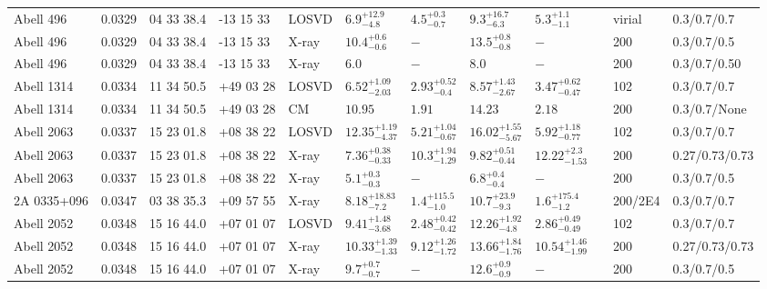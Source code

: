 \begin{landscape}
\begin{center}
{\begin{longtable}{llllllllllll}
Abell 496 & 0.0329 & 04 33 38.4 & -13 15 33 & LOSVD & ${6.9}^{+12.9}_{-4.8}$ & ${4.5}^{+0.3}_{-0.7}$ & ${9.3}^{+16.7}_{-6.3}$ & ${5.3}^{+1.1}_{-1.1}$ & \citet{LO06.1} & virial & 0.3/0.7/0.7 \\
Abell 496 & 0.0329 & 04 33 38.4 & -13 15 33 & X-ray & ${10.4}^{+0.6}_{-0.6}$ & ${-}^{}_{}$ & ${13.5}^{+0.8}_{-0.8}$ & ${-}^{}_{}$ & \citet{XU01.1} & 200 & 0.3/0.7/0.5 \\
Abell 496 & 0.0329 & 04 33 38.4 & -13 15 33 & X-ray & ${6.0}^{}_{}$ & ${-}^{}_{}$ & ${8.0}^{}_{}$ & ${-}^{}_{}$ & \citet{MA99.1} & 200 & 0.3/0.7/0.50 \\
Abell 1314 & 0.0334 & 11 34 50.5 & +49 03 28 & LOSVD & ${6.52}^{+1.09}_{-2.03}$ & ${2.93}^{+0.52}_{-0.4}$ & ${8.57}^{+1.43}_{-2.67}$ & ${3.47}^{+0.62}_{-0.47}$ & \citet{WO10.1} & 102 & 0.3/0.7/0.7 \\
Abell 1314 & 0.0334 & 11 34 50.5 & +49 03 28 & CM & ${10.95}^{}_{}$ & ${1.91}^{}_{}$ & ${14.23}^{}_{}$ & ${2.18}^{}_{}$ & \citet{RI06.1} & 200 & 0.3/0.7/None \\
Abell 2063 & 0.0337 & 15 23 01.8 & +08 38 22 & LOSVD & ${12.35}^{+1.19}_{-4.37}$ & ${5.21}^{+1.04}_{-0.67}$ & ${16.02}^{+1.55}_{-5.67}$ & ${5.92}^{+1.18}_{-0.77}$ & \citet{WO10.1} & 102 & 0.3/0.7/0.7 \\
Abell 2063 & 0.0337 & 15 23 01.8 & +08 38 22 & X-ray & ${7.36}^{+0.38}_{-0.33}$ & ${10.3}^{+1.94}_{-1.29}$ & ${9.82}^{+0.51}_{-0.44}$ & ${12.22}^{+2.3}_{-1.53}$ & \citet{BA14.1} & 200 & 0.27/0.73/0.73 \\
Abell 2063 & 0.0337 & 15 23 01.8 & +08 38 22 & X-ray & ${5.1}^{+0.3}_{-0.3}$ & ${-}^{}_{}$ & ${6.8}^{+0.4}_{-0.4}$ & ${-}^{}_{}$ & \citet{XU01.1} & 200 & 0.3/0.7/0.5 \\
2A 0335+096 & 0.0347 & 03 38 35.3 & +09 57 55 & X-ray & ${8.18}^{+18.83}_{-7.2}$ & ${1.4}^{+115.5}_{-1.0}$ & ${10.7}^{+23.9}_{-9.3}$ & ${1.6}^{+175.4}_{-1.2}$ & \citet{VO06.1} & 200/2E4 & 0.3/0.7/0.7 \\
Abell 2052 & 0.0348 & 15 16 44.0 & +07 01 07 & LOSVD & ${9.41}^{+1.48}_{-3.68}$ & ${2.48}^{+0.42}_{-0.42}$ & ${12.26}^{+1.92}_{-4.8}$ & ${2.86}^{+0.49}_{-0.49}$ & \citet{WO10.1} & 102 & 0.3/0.7/0.7 \\
Abell 2052 & 0.0348 & 15 16 44.0 & +07 01 07 & X-ray & ${10.33}^{+1.39}_{-1.33}$ & ${9.12}^{+1.26}_{-1.72}$ & ${13.66}^{+1.84}_{-1.76}$ & ${10.54}^{+1.46}_{-1.99}$ & \citet{BA14.1} & 200 & 0.27/0.73/0.73 \\
Abell 2052 & 0.0348 & 15 16 44.0 & +07 01 07 & X-ray & ${9.7}^{+0.7}_{-0.7}$ & ${-}^{}_{}$ & ${12.6}^{+0.9}_{-0.9}$ & ${-}^{}_{}$ & \citet{XU01.1} & 200 & 0.3/0.7/0.5 \\

\end{longtable}}
\end{center}
\end{landscape}
